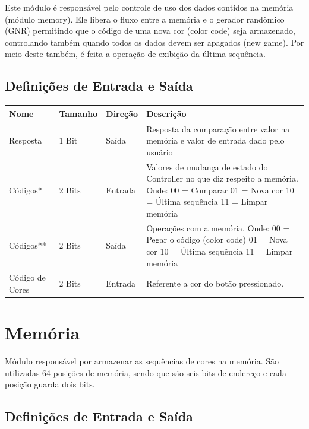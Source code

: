 \documentclass{report}
\begin{document}
  Este módulo é responsável pelo controle de uso dos dados contidos na memória (módulo memory). Ele libera o fluxo entre a memória e o gerador randômico (GNR) permitindo que o código de uma nova cor (color code) seja armazenado, controlando também quando todos os dados devem ser apagados (new game). Por meio deste também, é feita a operação de exibição da última sequência.
  
    \subsection{Definições de Entrada e Saída}
     \begin{table}[H]
       \centering
        \begin{tabular}[pos]{|m{2cm} |m{2cm}| m{3cm} | m{5cm}|} 
         \hline
          \cellcolor[gray]{0.9}
           \textbf{Nome} & \cellcolor[gray]{0.9} \textbf{Tamanho}  &\cellcolor[gray]{0.9}\textbf{Direção} & \cellcolor[gray]{0.9}\textbf{Descrição}\\ \hline
                Resposta & 1 Bit & Saída & Resposta da comparação entre valor na memória e valor de entrada dado pelo usuário\\ \hline
                Códigos* & 2 Bits & Entrada & Valores de mudança de estado do Controller no que diz respeito a memória. 
Onde: 00 = Comparar
01 = Nova cor
10 = Última sequência
11 = Limpar memória
  \\ \hline
                Códigos** & 2 Bits & Saída & Operações com a memória. 
Onde: 00 = Pegar o código (color code)
01 = Nova cor
10 = Última sequência
11 = Limpar memória
 \\ \hline
                Código de Cores & 2 Bits & Entrada & Referente a cor do botão pressionado. \\ \hline
        \end{tabular}
       \end{table}
    
    
  \section{Memória}
  
    Módulo responsável por armazenar as sequências de cores na memória. São utilizadas 64 posições de memória, sendo que são seis bits de endereço e cada posição guarda dois bits.
    \subsection{Definições de Entrada e Saída}
    
\end{document}

